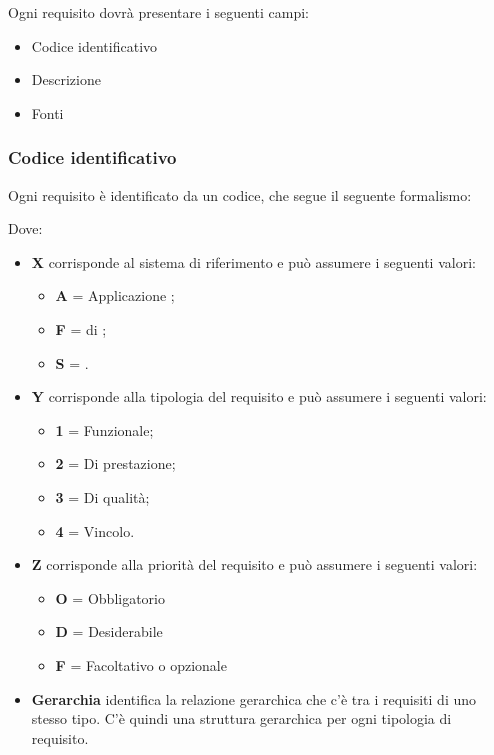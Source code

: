 Ogni requisito dovrà presentare i seguenti campi:
\begin{itemize}
 \item Codice identificativo
 \item Descrizione
 \item Fonti
\end{itemize}

\subsubsection{Codice identificativo}

Ogni requisito è identificato da un codice, che segue il seguente formalismo:
\begin{center}
\end{center}

Dove:
\begin{itemize}
 \item \textbf{X} corrisponde al sistema di riferimento e può assumere i seguenti valori:
    \begin{itemize}
     \item[] \textbf{A} = Applicazione ;
     \item[] \textbf{F} =  di ;
     \item[] \textbf{S} = .
    \end{itemize}

 \item \textbf{Y} corrisponde alla tipologia del requisito e può assumere i seguenti valori:
    \begin{itemize}
     \item[] \textbf{1} = Funzionale;
     \item[] \textbf{2} = Di prestazione;
     \item[] \textbf{3} = Di qualità;
     \item[] \textbf{4} = Vincolo.
    \end{itemize}

 \item \textbf{Z} corrisponde alla priorità del requisito e può assumere i seguenti valori:
    \begin{itemize}
     \item[] \textbf{O} = Obbligatorio
     \item[] \textbf{D} = Desiderabile
     \item[] \textbf{F} = Facoltativo o opzionale
    \end{itemize}

 \item \textbf{Gerarchia} identifica la relazione gerarchica che c'è tra i requisiti di uno stesso tipo. C'è quindi una struttura gerarchica per ogni tipologia di requisito.
\end{itemize}


